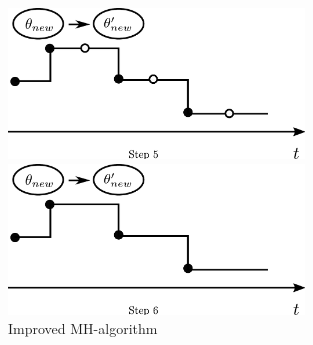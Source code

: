 \begin{figure}[H]
\begin{minipage}[hp]{0.45\linewidth}
    \vspace{-0 in}
  \end{minipage}
  \begin{minipage}[hp]{0.45\linewidth}
  \centering
    \includegraphics [width=0.70\textwidth, angle=0]{figs/plot5.pdf}
    \vspace{-0 in}
  \end{minipage}
  \begin{minipage}[hp]{0.45\linewidth}
  \centering
    \includegraphics [width=0.70\textwidth, angle=0]{figs/plot6.pdf}
    \vspace{-0 in}
  \end{minipage}
    \caption{Improved MH-algorithm}
   \label{fig:MH_improved}

  \end{figure}

